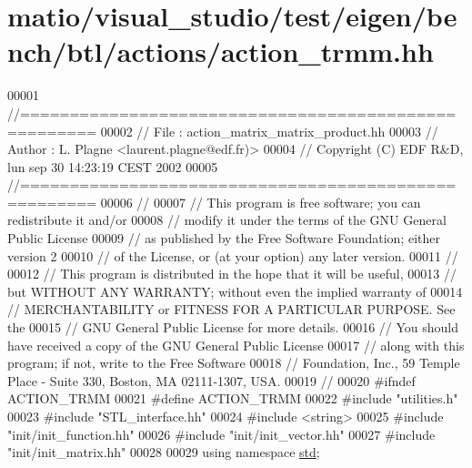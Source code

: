 \hypertarget{matio_2visual__studio_2test_2eigen_2bench_2btl_2actions_2action__trmm_8hh_source}{}\section{matio/visual\+\_\+studio/test/eigen/bench/btl/actions/action\+\_\+trmm.hh}
\label{matio_2visual__studio_2test_2eigen_2bench_2btl_2actions_2action__trmm_8hh_source}

\begin{DoxyCode}
00001 \textcolor{comment}{//=====================================================}
00002 \textcolor{comment}{// File   :  action\_matrix\_matrix\_product.hh}
00003 \textcolor{comment}{// Author :  L. Plagne <laurent.plagne@edf.fr)>}
00004 \textcolor{comment}{// Copyright (C) EDF R&D,  lun sep 30 14:23:19 CEST 2002}
00005 \textcolor{comment}{//=====================================================}
00006 \textcolor{comment}{//}
00007 \textcolor{comment}{// This program is free software; you can redistribute it and/or}
00008 \textcolor{comment}{// modify it under the terms of the GNU General Public License}
00009 \textcolor{comment}{// as published by the Free Software Foundation; either version 2}
00010 \textcolor{comment}{// of the License, or (at your option) any later version.}
00011 \textcolor{comment}{//}
00012 \textcolor{comment}{// This program is distributed in the hope that it will be useful,}
00013 \textcolor{comment}{// but WITHOUT ANY WARRANTY; without even the implied warranty of}
00014 \textcolor{comment}{// MERCHANTABILITY or FITNESS FOR A PARTICULAR PURPOSE.  See the}
00015 \textcolor{comment}{// GNU General Public License for more details.}
00016 \textcolor{comment}{// You should have received a copy of the GNU General Public License}
00017 \textcolor{comment}{// along with this program; if not, write to the Free Software}
00018 \textcolor{comment}{// Foundation, Inc., 59 Temple Place - Suite 330, Boston, MA  02111-1307, USA.}
00019 \textcolor{comment}{//}
00020 \textcolor{preprocessor}{#ifndef ACTION\_TRMM}
00021 \textcolor{preprocessor}{#define ACTION\_TRMM}
00022 \textcolor{preprocessor}{#include "utilities.h"}
00023 \textcolor{preprocessor}{#include "STL\_interface.hh"}
00024 \textcolor{preprocessor}{#include <string>}
00025 \textcolor{preprocessor}{#include "init/init\_function.hh"}
00026 \textcolor{preprocessor}{#include "init/init\_vector.hh"}
00027 \textcolor{preprocessor}{#include "init/init\_matrix.hh"}
00028 
00029 \textcolor{keyword}{using namespace }\hyperlink{namespacestd}{std};

\end{DoxyCode}
